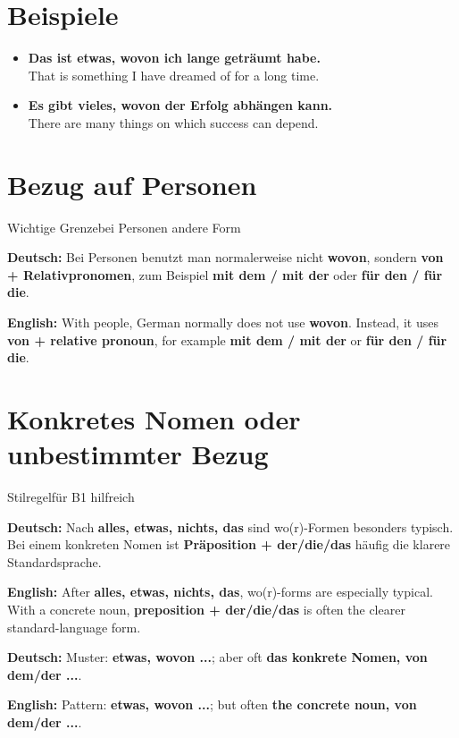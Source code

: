 \documentclass[a4paper,11pt]{article}
\newcommand{\GermanText}[1]{\textbf{Deutsch: }#1\par}
\newcommand{\EnglishText}[1]{{\small\color{SoftGray}\textbf{English: }#1\par}}
\newcommand{\ExampleItem}[2]{\item \textbf{#1}\\{\small\color{SoftGray}#2}}
\begin{document}
\section{Beispiele}

\begin{exbox}

\begin{itemize}

\ExampleItem{Das ist etwas, wovon ich lange geträumt habe.}{That is something I have dreamed of for a long time.}

\ExampleItem{Es gibt vieles, wovon der Erfolg abhängen kann.}{There are many things on which success can depend.}

\end{itemize}

\end{exbox}

\section{Bezug auf Personen}

\begin{grammarentry}{Wichtige Grenze}{bei Personen andere Form}

\GermanText{Bei Personen benutzt man normalerweise nicht \textbf{wovon}, sondern \textbf{von + Relativpronomen}, zum Beispiel \textbf{mit dem / mit der} oder \textbf{für den / für die}.}

\EnglishText{With people, German normally does not use \textbf{wovon}. Instead, it uses \textbf{von + relative pronoun}, for example \textbf{mit dem / mit der} or \textbf{für den / für die}.}

\end{grammarentry}

\section{Konkretes Nomen oder unbestimmter Bezug}

\begin{grammarentry}{Stilregel}{für B1 hilfreich}

\GermanText{Nach \textbf{alles, etwas, nichts, das} sind wo(r)-Formen besonders typisch. Bei einem konkreten Nomen ist \textbf{Präposition + der/die/das} häufig die klarere Standardsprache.}

\EnglishText{After \textbf{alles, etwas, nichts, das}, wo(r)-forms are especially typical. With a concrete noun, \textbf{preposition + der/die/das} is often the clearer standard-language form.}

\GermanText{Muster: \textbf{etwas, wovon ...}; aber oft \textbf{das konkrete Nomen, von dem/der ...}.}

\EnglishText{Pattern: \textbf{etwas, wovon ...}; but often \textbf{the concrete noun, von dem/der ...}.}

\end{grammarentry}
\end{document}
